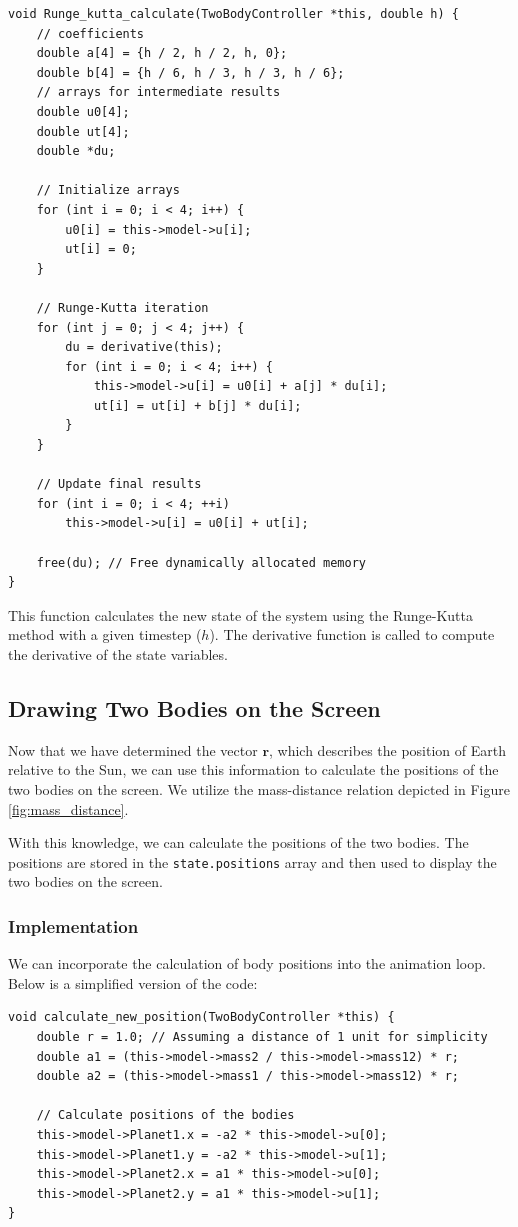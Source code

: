 \documentclass{article}
\begin{document}
\begin{verbatim}
void Runge_kutta_calculate(TwoBodyController *this, double h) {
    // coefficients
    double a[4] = {h / 2, h / 2, h, 0};
    double b[4] = {h / 6, h / 3, h / 3, h / 6};
    // arrays for intermediate results
    double u0[4];
    double ut[4];
    double *du;

    // Initialize arrays
    for (int i = 0; i < 4; i++) {
        u0[i] = this->model->u[i];
        ut[i] = 0;
    }

    // Runge-Kutta iteration
    for (int j = 0; j < 4; j++) {
        du = derivative(this);
        for (int i = 0; i < 4; i++) {
            this->model->u[i] = u0[i] + a[j] * du[i];
            ut[i] = ut[i] + b[j] * du[i];
        }
    }

    // Update final results
    for (int i = 0; i < 4; ++i)
        this->model->u[i] = u0[i] + ut[i];

    free(du); // Free dynamically allocated memory
}
\end{verbatim}

This function calculates the new state of the system using the Runge-Kutta method with a given timestep (\(h\)). The derivative function is called to compute the derivative of the state variables.

\newpage
\subsection*{Drawing Two Bodies on the Screen}

Now that we have determined the vector $\mathbf{r}$, which describes the position of Earth relative to the Sun, we can use this information to calculate the positions of the two bodies on the screen. We utilize the mass-distance relation depicted in Figure \ref{fig:mass_distance}.

With this knowledge, we can calculate the positions of the two bodies. The positions are stored in the \texttt{state.positions} array and then used to display the two bodies on the screen.

\subsubsection*{Implementation}

We can incorporate the calculation of body positions into the animation loop. Below is a simplified version of the code:

\begin{verbatim}
void calculate_new_position(TwoBodyController *this) {
    double r = 1.0; // Assuming a distance of 1 unit for simplicity
    double a1 = (this->model->mass2 / this->model->mass12) * r;
    double a2 = (this->model->mass1 / this->model->mass12) * r;

    // Calculate positions of the bodies
    this->model->Planet1.x = -a2 * this->model->u[0];
    this->model->Planet1.y = -a2 * this->model->u[1];
    this->model->Planet2.x = a1 * this->model->u[0];
    this->model->Planet2.y = a1 * this->model->u[1];
}
\end{verbatim}
\end{document}
